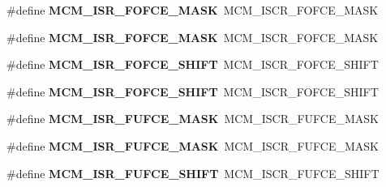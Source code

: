 \begin{DoxyCompactItemize}
\item 
\#define {\bfseries M\+C\+M\+\_\+\+I\+S\+R\+\_\+\+F\+O\+F\+C\+E\+\_\+\+M\+A\+SK}~M\+C\+M\+\_\+\+I\+S\+C\+R\+\_\+\+F\+O\+F\+C\+E\+\_\+\+M\+A\+SK\hypertarget{group__Backward__Compatibility__Symbols_gaad457cfff1c2d9349ece02993cc593a0}{}\label{group__Backward__Compatibility__Symbols_gaad457cfff1c2d9349ece02993cc593a0}

\item 
\#define {\bfseries M\+C\+M\+\_\+\+I\+S\+R\+\_\+\+F\+O\+F\+C\+E\+\_\+\+M\+A\+SK}~M\+C\+M\+\_\+\+I\+S\+C\+R\+\_\+\+F\+O\+F\+C\+E\+\_\+\+M\+A\+SK\hypertarget{group__Backward__Compatibility__Symbols_gaad457cfff1c2d9349ece02993cc593a0}{}\label{group__Backward__Compatibility__Symbols_gaad457cfff1c2d9349ece02993cc593a0}

\item 
\#define {\bfseries M\+C\+M\+\_\+\+I\+S\+R\+\_\+\+F\+O\+F\+C\+E\+\_\+\+S\+H\+I\+FT}~M\+C\+M\+\_\+\+I\+S\+C\+R\+\_\+\+F\+O\+F\+C\+E\+\_\+\+S\+H\+I\+FT\hypertarget{group__Backward__Compatibility__Symbols_ga818184249ac03775dce58bbe4c7dbfb7}{}\label{group__Backward__Compatibility__Symbols_ga818184249ac03775dce58bbe4c7dbfb7}

\item 
\#define {\bfseries M\+C\+M\+\_\+\+I\+S\+R\+\_\+\+F\+O\+F\+C\+E\+\_\+\+S\+H\+I\+FT}~M\+C\+M\+\_\+\+I\+S\+C\+R\+\_\+\+F\+O\+F\+C\+E\+\_\+\+S\+H\+I\+FT\hypertarget{group__Backward__Compatibility__Symbols_ga818184249ac03775dce58bbe4c7dbfb7}{}\label{group__Backward__Compatibility__Symbols_ga818184249ac03775dce58bbe4c7dbfb7}

\item 
\#define {\bfseries M\+C\+M\+\_\+\+I\+S\+R\+\_\+\+F\+U\+F\+C\+E\+\_\+\+M\+A\+SK}~M\+C\+M\+\_\+\+I\+S\+C\+R\+\_\+\+F\+U\+F\+C\+E\+\_\+\+M\+A\+SK\hypertarget{group__Backward__Compatibility__Symbols_gad5dd19766af96cb8cdec78954064cfab}{}\label{group__Backward__Compatibility__Symbols_gad5dd19766af96cb8cdec78954064cfab}

\item 
\#define {\bfseries M\+C\+M\+\_\+\+I\+S\+R\+\_\+\+F\+U\+F\+C\+E\+\_\+\+M\+A\+SK}~M\+C\+M\+\_\+\+I\+S\+C\+R\+\_\+\+F\+U\+F\+C\+E\+\_\+\+M\+A\+SK\hypertarget{group__Backward__Compatibility__Symbols_gad5dd19766af96cb8cdec78954064cfab}{}\label{group__Backward__Compatibility__Symbols_gad5dd19766af96cb8cdec78954064cfab}

\item 
\#define {\bfseries M\+C\+M\+\_\+\+I\+S\+R\+\_\+\+F\+U\+F\+C\+E\+\_\+\+S\+H\+I\+FT}~M\+C\+M\+\_\+\+I\+S\+C\+R\+\_\+\+F\+U\+F\+C\+E\+\_\+\+S\+H\+I\+FT\hypertarget{group__Backward__Compatibility__Symbols_ga6dedcd01f8354cf840e86447f16977bc}{}\label{group__Backward__Compatibility__Symbols_ga6dedcd01f8354cf840e86447f16977bc}


\end{DoxyCompactItemize}

